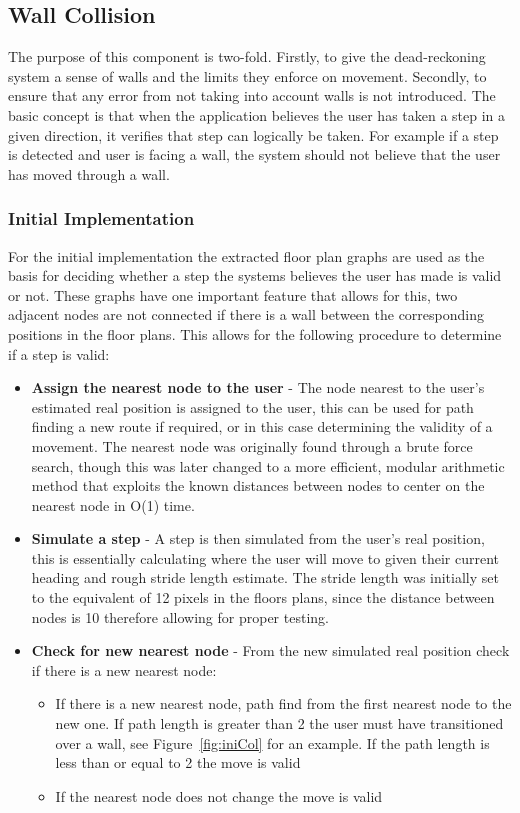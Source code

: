 \documentclass[main.tex]{subfiles}
\begin{document}
\subsection{Wall Collision}

The purpose of this component is two-fold. Firstly, to give the dead-reckoning system a sense of walls and the limits they enforce on movement. Secondly, to ensure that any error from not taking into account walls is not introduced. The basic concept is that when the application believes the user has taken a step in a given direction, it verifies that step can logically be taken. For example if a step is detected and user is facing a wall, the system should not believe that the user has moved through a wall.

\subsubsection{Initial Implementation}

For the initial implementation the extracted floor plan graphs are used as the basis for deciding whether a step the systems believes the user has made is valid or not. These graphs have one important feature that allows for this, two adjacent nodes are not connected if there is a wall between the corresponding positions in the floor plans. This allows for the following procedure to determine if a step is valid:

\begin{itemize}
	\item \textbf{Assign the nearest node to the user} - The node nearest to the user's estimated real position is assigned to the user, this can be used for path finding a new route if required, or in this case determining the validity of a movement. The nearest node was originally found through a brute force search, though this was later changed to a more efficient, modular arithmetic method that exploits the known distances between nodes to center on the nearest node in O(1) time.
	\item \textbf{Simulate a step} - A step is then simulated from the user's real position, this is essentially calculating where the user will move to given their current heading and rough stride length estimate. The stride length was initially set to the equivalent of 12 pixels in the floors plans, since the distance between nodes is 10 therefore allowing for proper testing. 
	\item \textbf{Check for new nearest node} - From the new simulated real position check if there is a new nearest node:
	\begin{itemize}
		\item If there is a new nearest node, path find from the first nearest node to the new one. If path length is greater than 2 the user must have transitioned over a wall, see Figure~\ref{fig:iniCol} for an example. If the path length is less than or equal to 2 the move is valid
		\item If the nearest node does not change the move is valid
	\end{itemize}
\end{itemize}
\end{document}

